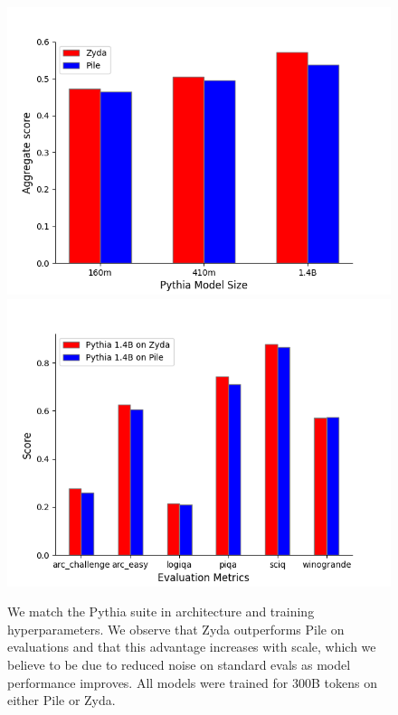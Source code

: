 \documentclass{article}
\begin{document}
\begin{figure}[htbp]
    \centering
        {\includegraphics[width=.49\textwidth]{figures/zyda-vs-pile-across-scale.png}}
    \hfill
        {\includegraphics[width=.49\textwidth]{figures/zyda-vs-pile-across-evals.png}}
    \caption{We match the Pythia suite in architecture and training hyperparameters. We observe that Zyda outperforms Pile on evaluations and that this advantage increases with scale, which we believe to be due to reduced noise on standard evals as model performance improves. All models were trained for 300B tokens on either Pile or Zyda.}
    \vspace{-2ex}
\end{figure}
\end{document}
